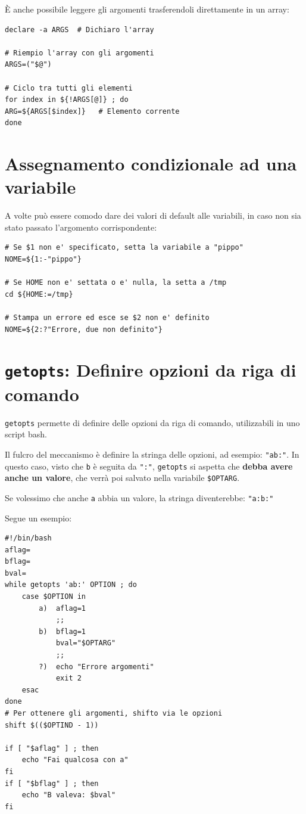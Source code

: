 \documentclass[a4paper]{report}
\newenvironment{code}{\begin{tcolorbox}[size=small]}{\end{tcolorbox}}
\begin{document}
È anche possibile leggere gli argomenti trasferendoli direttamente in un array:

\begin{code}
\begin{lstlisting}
declare -a ARGS  # Dichiaro l'array

# Riempio l'array con gli argomenti
ARGS=("$@")

# Ciclo tra tutti gli elementi
for index in ${!ARGS[@]} ; do
ARG=${ARGS[$index]}   # Elemento corrente
done
\end{lstlisting}
\end{code}

\section{Assegnamento condizionale ad una variabile}
A volte può essere comodo dare dei valori di default alle variabili, in caso non sia stato passato l'argomento corrispondente:
\begin{code}
\begin{lstlisting}
# Se $1 non e' specificato, setta la variabile a "pippo"
NOME=${1:-"pippo"}

# Se HOME non e' settata o e' nulla, la setta a /tmp
cd ${HOME:=/tmp}

# Stampa un errore ed esce se $2 non e' definito
NOME=${2:?"Errore, due non definito"}
\end{lstlisting}
\end{code}

\section{\texttt{getopts}: Definire opzioni da riga di comando}

\texttt{getopts} permette di definire delle opzioni da riga di comando, utilizzabili in uno script bash. 

Il fulcro del meccanismo è definire la stringa delle opzioni, ad esempio: \texttt{"ab:"}. In questo caso, visto che \texttt{b} è seguita da \texttt{":"}, \texttt{getopts} si aspetta che \textbf{debba avere anche un valore}, che verrà poi salvato nella variabile \texttt{\$OPTARG}.

Se volessimo che anche \texttt{a} abbia un valore, la stringa diventerebbe: \texttt{"a:b:"}

Segue un esempio:

\begin{code}
\begin{lstlisting}
#!/bin/bash
aflag=
bflag=
bval=
while getopts 'ab:' OPTION ; do
	case $OPTION in
		a)	aflag=1
			;;
		b)	bflag=1
			bval="$OPTARG"
			;;
		?)	echo "Errore argomenti"
			exit 2
	esac
done
# Per ottenere gli argomenti, shifto via le opzioni
shift $(($OPTIND - 1))

if [ "$aflag" ] ; then
	echo "Fai qualcosa con a"
fi
if [ "$bflag" ]	; then
	echo "B valeva: $bval"
fi
\end{lstlisting}
\end{code}
\end{document}
